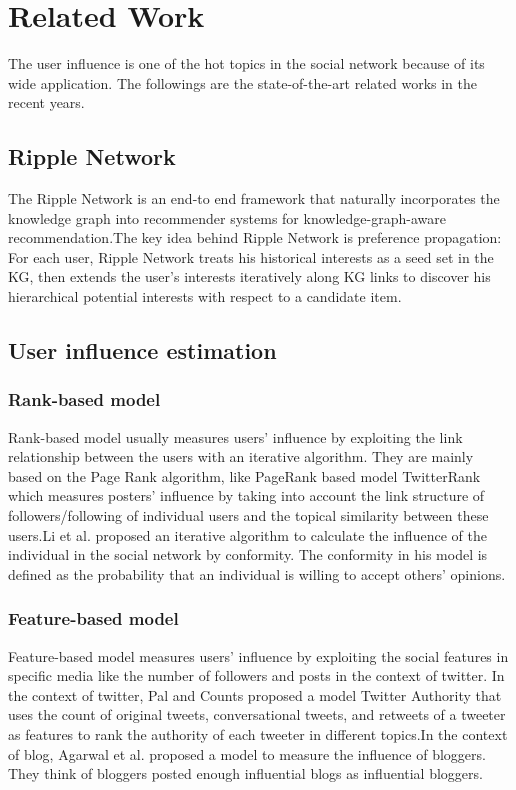 \documentclass{acmtog} %
\begin{document}
\section{Related Work}
The user influence is one of the hot topics in the social network because of its wide application. The followings are the state-of-the-art related works in the recent years.

\subsection{Ripple Network}

The Ripple Network is an end-to end framework that naturally incorporates the knowledge graph into recommender systems for knowledge-graph-aware
recommendation.The key idea behind Ripple Network is preference propagation: For each user, Ripple Network treats his historical interests as a seed set in the KG, then extends the user’s interests iteratively
along KG links to discover his hierarchical potential interests with
respect to a candidate item.\cite{wang2018ripple}

\subsection{User influence estimation}

\subsubsection{Rank-based model}
Rank-based model usually measures users’ influence by exploiting the link relationship between the users with an iterative algorithm. They are mainly based on the Page Rank algorithm, like PageRank based model TwitterRank\cite{weng2010twitterrank} which measures posters’ influence by taking into account the link structure of followers/following of individual users and the topical similarity between these users.Li et al. \cite{li2011casino} proposed an iterative algorithm to calculate the influence of the individual in the social network by conformity. The conformity in his model is defined as the probability that an individual is willing to accept others’ opinions.

\subsubsection{Feature-based model}
Feature-based model measures users’ influence by exploiting the social features in specific media like the number of followers and posts in the context of twitter. In the context of twitter, Pal and Counts\cite{ou2016asymmetric} proposed a model Twitter Authority that uses the count of original tweets, conversational tweets, and retweets of a tweeter as features to rank the authority of each tweeter in different topics.In the context of blog, Agarwal et al. \cite{agarwal2008identifying} proposed a model to measure the influence of bloggers. They think of bloggers posted enough influential blogs as influential bloggers.
\end{document}
